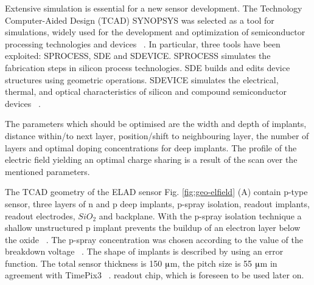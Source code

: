 
Extensive simulation is essential for a new sensor development. 
The  Technology Computer-Aided Design (TCAD) SYNOPSYS was selected  as a tool for simulations, widely used for the development and optimization of semiconductor processing technologies and devices ~\cite{Synopsys}. 
In particular, three tools have been exploited: SPROCESS, SDE and SDEVICE. 
SPROCESS simulates the fabrication steps in silicon process technologies. 
SDE builds and edits device structures using geometric operations. 
SDEVICE simulates the electrical, thermal, and optical characteristics of silicon and compound semiconductor devices ~\cite{SynopsysIncG-2012.06}.

The parameters which should be optimised are the width and depth of implants, distance within/to next layer, position/shift to neighbouring layer,
 the number of layers and optimal doping concentrations for deep implants.
The profile of the electric field yielding an optimal charge sharing is a result of the scan over the mentioned parameters. 

The TCAD geometry of the ELAD sensor Fig. \ref{fig:geo-elfield} (A) contain p-type sensor, three layers of n and p deep implants, p-spray isolation, readout implants, readout electrodes, $SiO_2$ and backplane. 
With the p-spray isolation technique a shallow unstructured p implant prevents the buildup of an electron layer below the oxide ~\cite{Lutz}. 
The p-spray concentration was chosen according to the value of the breakdown voltage ~\cite{Pellegrini}. 
The shape of implants is described by using an error function. 
The total sensor thickness is 150 $\muup$m, the pitch size is 55 $\muup$m in agreement with TimePix3 ~\cite{TimePix}. readout chip, which is foreseen to be used later on. 

